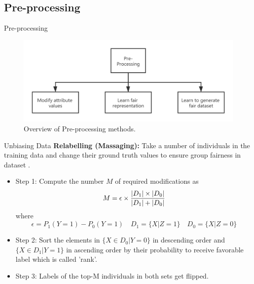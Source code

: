 \documentclass[10pt, xcolor=table,aspectratio=169]{beamer}
\begin{document}
\subsection{Pre-processing}
\begin{frame}{Pre-processing}
	\begin{figure}[t]
		\begin{center}
			\includegraphics[width=0.8\columnwidth]{./figs/pp1m.png}
		\end{center}
		\caption{Overview of Pre-processing methods.}
	\end{figure}

\end{frame}
\begin{frame}{Unbiasing Data}
	\textbf{Relabelling (Massaging):} Take a number of individuals in the training data and change their ground truth values to ensure group fairness in dataset \cite{kamiran2009classifying}.
	\begin{itemize}
		\item Step 1: Compute the number $M$ of required modifications as\[			M={\epsilon}\times \frac{|D_1|\times |D_0|}{|D_1|+|D_0|}
		      \]
		      where\[	\epsilon=P_1(Y=1)-P_0(Y=1) \quad D_1=\{X|Z=1\} \quad D_0=\{X|Z=0\}
		      \]
		\item Step 2: Sort the elements in $\{X\in D_0|Y=0\}$ in descending order and $\{X\in D_1|Y=1\}$ in ascending order by their probability to receive favorable label which is called 'rank'.
		\item Step 3: Labels of the top-M individuals in both sets get flipped.

	\end{itemize}

\end{frame}
\end{document}
